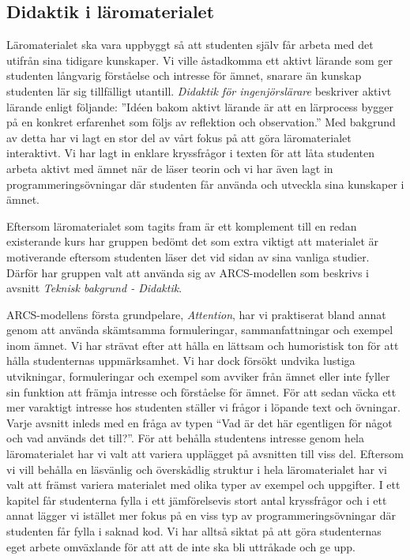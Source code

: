 \documentclass[12pt,a4paper,twoside,openright]{article}
\begin{document}
\subsection{Didaktik i läromaterialet}
\label{sec:matDidaktik}
Läromaterialet ska vara uppbyggt så att studenten själv får arbeta med
det utifrån sina tidigare kunskaper. Vi ville åstadkomma ett aktivt
lärande som ger studenten långvarig förståelse och intresse för ämnet,
snarare än kunskap studenten lär sig tillfälligt
utantill. \textit{Didaktik för ingenjörslärare}
\cite{didaktik_for_ingenjorslarare} beskriver aktivt lärande enligt
följande: ”Idéen bakom aktivt lärande är att en lärprocess bygger på
en konkret erfarenhet som följs av reflektion och observation.” Med
bakgrund av detta har vi lagt en stor del av vårt fokus på att göra
läromaterialet interaktivt. Vi har lagt in enklare kryssfrågor i
texten för att låta studenten arbeta aktivt med ämnet när de läser
teorin och vi har även lagt in programmeringsövningar där studenten
får använda och utveckla sina kunskaper i ämnet.

Eftersom läromaterialet som tagits fram är ett komplement till en
redan existerande kurs har gruppen bedömt det som extra viktigt att
materialet är motiverande eftersom studenten läser det vid sidan av
sina vanliga studier. Därför har gruppen valt att använda sig av
ARCS-modellen som beskrivs i avsnitt \textit{Teknisk bakgrund -
  Didaktik}.

ARCS-modellens första grundpelare, \textit{Attention}, har vi
praktiserat bland annat genom att använda skämtsamma formuleringar,
sammanfattningar och exempel inom ämnet. Vi har strävat efter att
hålla en lättsam och humoristisk ton för att hålla studenternas
uppmärksamhet. Vi har dock försökt undvika lustiga utvikningar,
formuleringar och exempel som avviker från ämnet eller inte fyller sin
funktion att främja intresse och förståelse för ämnet. För att sedan
väcka ett mer varaktigt intresse hos studenten ställer vi frågor i
löpande text och övningar. Varje avsnitt inleds med en fråga av typen
“Vad är det här egentligen för något och vad används det till?”. För
att behålla studentens intresse genom hela läromaterialet har vi valt
att variera upplägget på avsnitten till viss del. Eftersom vi vill
behålla en läsvänlig och överskådlig struktur i hela läromaterialet
har vi valt att främst variera materialet med olika typer av exempel
och uppgifter. I ett kapitel får studenterna fylla i ett jämförelsevis
stort antal kryssfrågor och i ett annat lägger vi istället mer fokus
på en viss typ av programmeringsövningar där studenten får fylla i
saknad kod. Vi har alltså siktat på att göra studenternas eget arbete
omväxlande för att att de inte ska bli uttråkade och ge upp.
\end{document}
